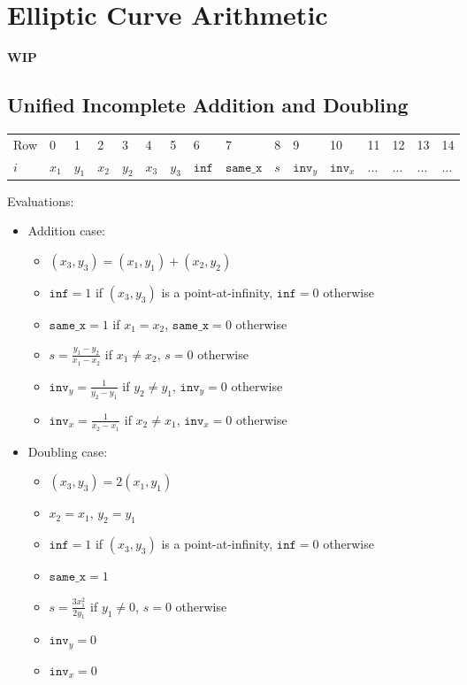 \section{Elliptic Curve Arithmetic}
\label{section:ec}
\textbf{WIP}

\subsection{Unified Incomplete Addition and Doubling}

\begin{center}
    \begin{table}[H]
        \begin{tabular}{llllllllllllllll}
            Row   & 0     & 1     & 2     & 3     & 4     & 5     & 6   & 7       & 8       & 9       & 10      & 11      & 12      & 13      & 14      \\
            $i$ & $x_1$ & $y_1$ & $x_2$ & $y_2$ & $x_3$ & $y_3$ & $\texttt{inf}$ & $\texttt{same\_x}$ & $s$ & $\texttt{inv}_y$ & $\texttt{inv}_x$ & $\dots$ & $\dots$ & $\dots$ & $\dots$ \\
        \end{tabular}
    \end{table}
\end{center}

Evaluations:
\begin{itemize}
	\item Addition case:
	\begin{itemize}
		\item $(x_3, y_3) = (x_1, y_1) + (x_2, y_2)$
		\item $\texttt{inf} = 1$ if $(x_3, y_3)$ is a point-at-infinity, $\texttt{inf} = 0$ otherwise
		\item $\texttt{same\_x} = 1$ if $x_1 = x_2$, $\texttt{same\_x} = 0$ otherwise
		\item $s = \frac{y_1 - y_2}{x_1 - x_2}$ if $x_1 \neq x_2$, $s = 0$ otherwise
		\item $\texttt{inv}_y = \frac{1}{y_2 - y_1}$ if $y_2 \neq y_1$, $\texttt{inv}_y = 0$ otherwise 
		\item $\texttt{inv}_x = \frac{1}{x_2 - x_1}$ if $x_2 \neq x_1$, $\texttt{inv}_x= 0$ otherwise
	\end{itemize}
	\item Doubling case:
	\begin{itemize}
		\item $(x_3, y_3) = 2(x_1, y_1)$
		\item $x_2 = x_1$, $y_2 = y_1$
		\item $\texttt{inf} = 1$ if $(x_3, y_3)$ is a point-at-infinity, $\texttt{inf} = 0$ otherwise
		\item $\texttt{same\_x} = 1$
		\item $s = \frac{3x_1^2}{2y_1}$ if $y_1 \neq 0$, $s = 0$ otherwise
		\item $\texttt{inv}_y = 0$ 
		\item $\texttt{inv}_x= 0$
	\end{itemize}
\end{itemize}

